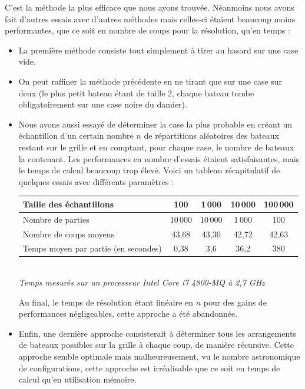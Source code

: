 C'est la méthode la plus efficace que nous ayons trouvée. Néanmoins nous avons fait d'autres essais avec d'autres méthodes mais celles-ci étaient beaucoup moins performantes, que ce soit en nombre de coups pour la résolution, qu'en temps :
\begin{itemize}
\item La première méthode consiste tout simplement à tirer au hasard sur une case vide.
\item On peut raffiner la méthode précédente en ne tirant que sur une case sur deux (le plus petit bateau étant de taille 2, chaque bateau tombe obligatoirement sur une case noire du damier).
\item Nous avons aussi essayé de déterminer la case la plus probable en créant un échantillon d'un certain nombre $n$ de répartitions aléatoires des bateaux restant sur le grille et en comptant, pour chaque case, le nombre de bateaux la contenant. Les performances en nombre d'essais étaient satisfaisantes, mais le temps de calcul beaucoup trop élevé. Voici un tableau récapitulatif de quelques essais avec différents paramètres :

\medskip

\begin{center}
\begin{tabular}{|l|c|c|c|c|}
\hline
Taille des échantillons & 100 & 1\,000 & 10\,000 & 100\,000\\
\hline
Nombre de parties & 10\,000 & 10\,000 & 1\,000 & 100\\
\hline
Nombre de coups moyens & 43,68 & 43,30 & 42,72 & 42,63\\
\hline
Temps moyen par partie (en secondes) & 0,38 & 3,6 & 36,2 & 380\\
\hline 
\end{tabular}\\
\vspace*{0.1cm}
\textit{Temps mesurés sur un processeur Intel Core i7 4800-MQ à 2,7 GHz}
\end{center}

\medskip

Au final, le temps de résolution étant linéaire en $n$ pour des gains de performances négligeables, cette approche a été abandonnée.

\item Enfin, une dernière approche consisterait à déterminer tous les arrangements de bateaux possibles sur la grille à chaque coup, de manière récursive. Cette approche semble optimale mais malheureusement, vu le nombre astronomique de configurations, cette approche est irréalisable que ce soit en temps de calcul qu'en utilisation mémoire. 

\end{itemize}  

